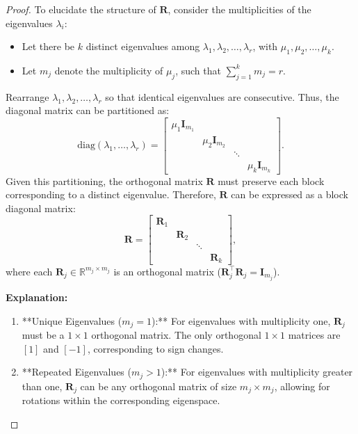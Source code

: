 \begin{proof}
To elucidate the structure of \( \mathbf{R} \), consider the multiplicities of the eigenvalues \( \lambda_i \):

\begin{itemize}
    \item Let there be \( k \) distinct eigenvalues among \( \lambda_1, \lambda_2, \ldots, \lambda_r \), with \( \mu_1, \mu_2, \ldots, \mu_k \).
    \item Let \( m_j \) denote the multiplicity of \( \mu_j \), such that \( \sum_{j=1}^k m_j = r \).
\end{itemize}

Rearrange \( \lambda_1, \lambda_2, \ldots, \lambda_r \) so that identical eigenvalues are consecutive. Thus, the diagonal matrix can be partitioned as:
\[
    \text{diag}(\lambda_1, \ldots, \lambda_r) = \begin{bmatrix}
        \mu_1 \mathbf{I}_{m_1} & & & \\
        & \mu_2 \mathbf{I}_{m_2} & & \\
        & & \ddots & \\
        & & & \mu_k \mathbf{I}_{m_k}
    \end{bmatrix}.
\]
Given this partitioning, the orthogonal matrix \( \mathbf{R} \) must preserve each block corresponding to a distinct eigenvalue. Therefore, \( \mathbf{R} \) can be expressed as a block diagonal matrix:
\[
    \mathbf{R} = \begin{bmatrix}
        \mathbf{R}_1 & & & \\
        & \mathbf{R}_2 & & \\
        & & \ddots & \\
        & & & \mathbf{R}_k
    \end{bmatrix},
\]
where each \( \mathbf{R}_j \in \mathbb{R}^{m_j \times m_j} \) is an orthogonal matrix (\( \mathbf{R}_j^\top \mathbf{R}_j = \mathbf{I}_{m_j} \)).

\textbf{Explanation:}

\begin{enumerate}
    \item **Unique Eigenvalues (\( m_j = 1 \)):**  
        For eigenvalues with multiplicity one, \( \mathbf{R}_j \) must be a \( 1 \times 1 \) orthogonal matrix. The only orthogonal \( 1 \times 1 \) matrices are \( [1] \) and \( [-1] \), corresponding to sign changes.
    
    \item **Repeated Eigenvalues (\( m_j > 1 \)):**  
        For eigenvalues with multiplicity greater than one, \( \mathbf{R}_j \) can be any orthogonal matrix of size \( m_j \times m_j \), allowing for rotations within the corresponding eigenspace.
\end{enumerate}


\end{proof}
